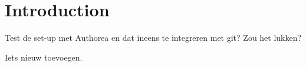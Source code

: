 \section{Introduction}
Test de set-up met Authorea en dat ineens te integreren met git? Zou het lukken?

Iets nieuw toevoegen.